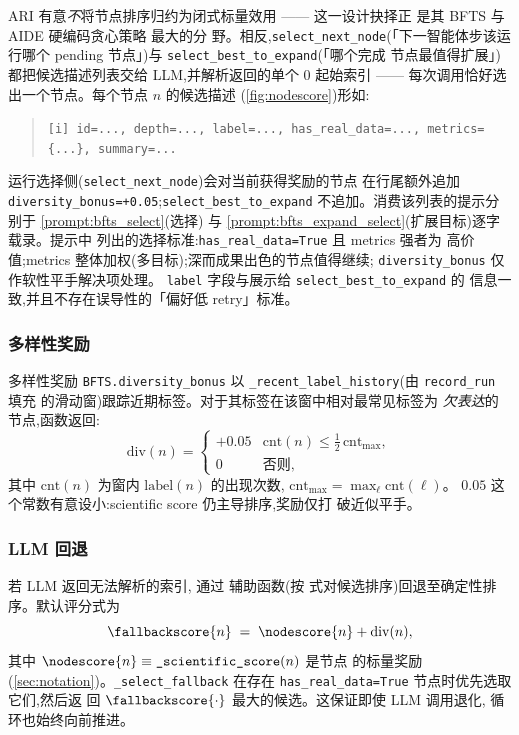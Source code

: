 ARI 有意\emph{不}将节点排序归约为闭式标量效用 —— 这一设计抉择正
是其 BFTS 与 AIDE 硬编码贪心策略 \cite{jiang2025aide} 最大的分
野。相反,\texttt{select\_next\_node}(「下一智能体步该运行哪个
pending 节点」)与 \texttt{select\_best\_to\_expand}(「哪个完成
节点最值得扩展」)都把候选描述列表交给 LLM,并解析返回的单个 0
起始索引 —— 每次调用恰好选出一个节点。每个节点 $n$ 的候选描述
(\cref{fig:nodescore})形如:
\begin{quote}\small\texttt{[i] id=..., depth=..., label=..., has\_real\_data=..., metrics=\{...\}, summary=...}\end{quote}
运行选择侧(\texttt{select\_next\_node})会对当前获得奖励的节点
在行尾额外追加 \texttt{diversity\_bonus=+0.05};\texttt{select\_best\_to\_expand}
不追加。消费该列表的提示分别于 \cref{prompt:bfts_select}(选择)
与 \cref{prompt:bfts_expand_select}(扩展目标)逐字载录。提示中
列出的选择标准:\texttt{has\_real\_data=True} 且 metrics 强者为
高价值;metrics 整体加权(多目标);深而成果出色的节点值得继续;
\texttt{diversity\_bonus} 仅作软性平手解决项处理。
\texttt{label} 字段与展示给 \texttt{select\_best\_to\_expand} 的
信息一致,并且不存在误导性的「偏好低 retry」标准。

\subsubsection*{多样性奖励}\label{sec:exploration:diversity}

多样性奖励 \texttt{BFTS.diversity\_bonus} 以
\texttt{\_recent\_label\_history}(由 \texttt{record\_run} 填充
的滑动窗)跟踪近期标签。对于其标签在该窗中相对最常见标签为
\emph{欠表达}的节点,函数返回:
\begin{equation}\label{eq:diversity}
  \mathrm{div}(n) =
    \begin{cases}
      +0.05 & \mathrm{cnt}(n) \le \tfrac{1}{2}\,\mathrm{cnt}_{\max},\\
      0     & \text{否则,}
    \end{cases}
\end{equation}
其中 $\mathrm{cnt}(n)$ 为窗内 $\mathrm{label}(n)$ 的出现次数,
$\mathrm{cnt}_{\max}=\max_\ell\mathrm{cnt}(\ell)$。
$0.05$ 这个常数有意设小:scientific score 仍主导排序,奖励仅打
破近似平手。

\subsubsection*{LLM 回退}\label{sec:exploration:fallback}

若 LLM 返回无法解析的索引, 通过
 辅助函数(按 
式对候选排序)回退至确定性排序。默认评分式为
\begin{equation}\label{eq:fallback}
  \fallbackscore{n} \;=\; \nodescore{n} + \mathrm{div}(n),
\end{equation}
其中 $\nodescore{n}\equiv\texttt{\_scientific\_score}(n)$ 是节点
的标量奖励(\cref{sec:notation})。\texttt{\_select\_fallback}
在存在 \texttt{has\_real\_data=True} 节点时优先选取它们,然后返
回 $\fallbackscore{\cdot}$ 最大的候选。这保证即使 LLM 调用退化,
循环也始终向前推进。

